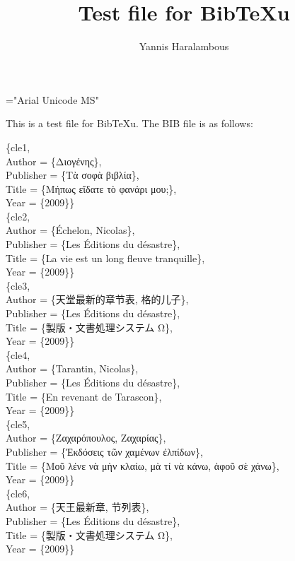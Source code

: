 ﻿\documentclass{article}
\title{Test file for Bib\TeX u}
\author{Yannis Haralambous}
\begin{document}
\maketitle
\font\x="Arial Unicode MS"
\let\em\x
\x

This is a test file for Bib\TeX u. The BIB file is as follows:

\medskip

\noindent@book\{cle1,\\
	Author = \{Διογένης\},\\
	Publisher = \{Τὰ σοφὰ βιβλία\},\\
	Title = \{Μήπως εἴδατε τὸ φανάρι μου;\},\\
	Year = \{2009\}\}\\

\noindent@book\{cle2,\\
	Author = \{Échelon, Nicolas\},\\
	Publisher = \{Les Éditions du désastre\},\\
	Title = \{La vie est un long fleuve tranquille\},\\
	Year = \{2009\}\}\\

\noindent@book\{cle3,\\
	Author = \{天堂最新的章节表, 格的儿子\},\\
	Publisher = \{Les Éditions du désastre\},\\
	Title = \{製版・文書処理システム Ω\},\\
	Year = \{2009\}\}\\

\noindent@book\{cle4,\\
	Author = \{Tarantin, Nicolas\},\\
	Publisher = \{Les Éditions du désastre\},\\
	Title = \{En revenant de Tarascon\},\\
	Year = \{2009\}\}\\

\noindent@book\{cle5,\\
	Author = \{Ζαχαρόπουλος, Ζαχαρίας\},\\
	Publisher = \{Ἐκδόσεις τῶν χαμένων ἐλπίδων\},\\
	Title = \{Μοῦ λένε νὰ μὴν κλαίω, μὰ τί νὰ κάνω, ἀφοῦ σὲ χάνω\},\\
	Year = \{2009\}\}\\

\noindent@book\{cle6,\\
	Author = \{天王最新章, 节列表\},\\
	Publisher = \{Les Éditions du désastre\},\\
	Title = \{製版・文書処理システム Ω\},\\
	Year = \{2009\}\}\\
\end{document}

